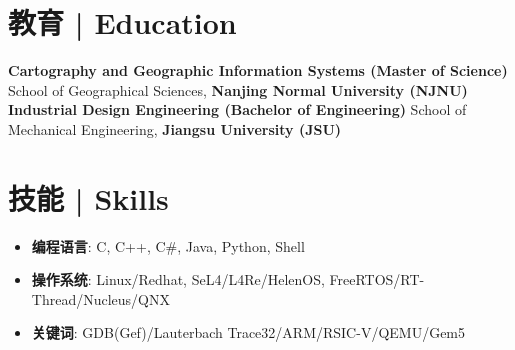\documentclass{resume}
\begin{document}
\section{教育 | Education}
\textbf{Cartography and Geographic Information Systems (Master of Science)}\newline
School of Geographical Sciences, \textbf{Nanjing Normal University (NJNU)}
\textbf{Industrial Design Engineering (Bachelor of Engineering)}\newline
School of Mechanical Engineering, \textbf{Jiangsu University (JSU)}
\spaceline{}

\section{技能 | Skills}
\begin{itemize}[parsep=0.2ex]
  \item \textbf{编程语言}: C, C++, C\#, Java, Python, Shell
  \item \textbf{操作系统}: Linux/Redhat, SeL4/L4Re/HelenOS, FreeRTOS/RT-Thread/Nucleus/QNX
  \item \textbf{关键词}: GDB(Gef)/Lauterbach Trace32/ARM/RSIC-V/QEMU/Gem5
\end{itemize}

\spaceline{}
\end{document}
